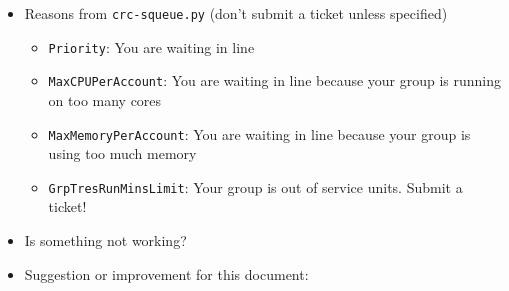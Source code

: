 \documentclass[landscape,a0b,final]{a0poster}
\newcommand{\code}[1]{\texttt{#1}}
\newcommand{\myurl}[1]{\href{#1}{\color{blue}{#1}}}
\newcommand{\mysection}[1]{
    \begin{center}
        \pbox{0.8\columnwidth}{}{linewidth=3mm,framearc=0.3,linecolor=black,fillstyle=gradient,gradangle=0,gradbegin=white,gradend=white,gradmidpoint=1.0,framesep=0.5em}{
            \begin{center}
                \Large\color{black}{\bf{#1}}
            \end{center}
        }
    \end{center}
    \vspace{0.25cm}
}
\newenvironment{poster}{
  \begin{center}
  \begin{minipage}[c]{0.981\textwidth}
}{
  \end{minipage} 
  \end{center}
}
\newcommand{\pbox}[4]{
\psshadowbox[#3]{
\begin{minipage}[t][#2][t]{#1}
#4
\end{minipage}
}}
\begin{document}
\begin{poster}
\begin{multicols}{3}
\begin{center}
\begin{itemize}
            \item Reasons from \code{crc-squeue.py} (don't submit a ticket unless specified)
                \begin{itemize}
                    \item \code{Priority}: You are waiting in line
                    \item \code{MaxCPUPerAccount}: You are waiting in line because your group is running on too many cores
                    \item \code{MaxMemoryPerAccount}: You are waiting in line because your group is using too much memory
                    \item \code{GrpTresRunMinsLimit}: Your group is out of service units. Submit a ticket!
                \end{itemize}
        \end{itemize}
    \end{center}

    \vspace{0.1cm}
    \mysection{Notes}
    \Large    
    \begin{center}
        \begin{itemize}
            \item Is something not working? \myurl{https://crc.pitt.edu/tickets}
            \item Suggestion or improvement for this document: \\
                \myurl{https://github.com/barrymoo/crc-quicksummary/issues/new}
        \end{itemize}
    \end{center}

\end{multicols}

\end{poster}
\end{document}
